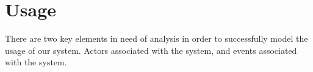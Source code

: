 \section{Usage}
\label{sec:usage}

There are two key elements in need of analysis in order to successfully model the usage of our system. Actors associated with the system, and events associated with the system.







